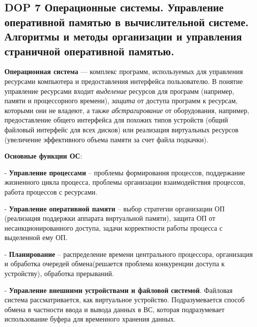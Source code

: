 \subsection{DOP 7 Операционные системы. Управление оперативной памятью в вычислительной системе. Алгоритмы и методы организации и управления страничной оперативной памятью.}

\textbf{Операционная система} --- комплекс программ, используемых для управления ресурсами компьютера и предоставления интерфейса пользователю.
В понятие управление ресурсами входит \textit{выделение} ресурсов для программ (например, памяти и процессорного времени),
\textit{защита} от доступа программ к ресурсам, которыми они не владеют, а также
\textit{абстрагирование} от оборудования, например, предоставление общего интерфейса для похожих типов устройств
(общий файловый интерфейс для всех дисков) или реализация виртуальных ресурсов (увеличение эффективного объема памяти за счет файла подкачки).



\textbf{Основные функции ОС}: 

- \textbf{Управление процессами} -- проблемы формирования процессов, поддержание жизненного цикла процесса, проблемы организации взаимодействия процессов, работа процессов с ресурсами.
    
- \textbf{Управление оперативной памяти} -- выбор стратегии организации ОП (реализация поддержки аппарата виртуальной памяти), защита ОП от несанкционированного доступа, задачи корректности работы процесса с выделенной ему ОП. 

- \textbf{Планирование} -- распределение времени центрального процессора, организация и обработка очередей обмена(решается проблема конкуренции доступа к устройству), обработка прерываний. 

- \textbf{Управление внешними устройствами и файловой системой}. Файловая система рассматривается, как виртуальное устройство. Подразумевается способ обмена в частности ввода и вывода данных в ВС, которая подразумевает использование буфера для временного хранения данных. 

